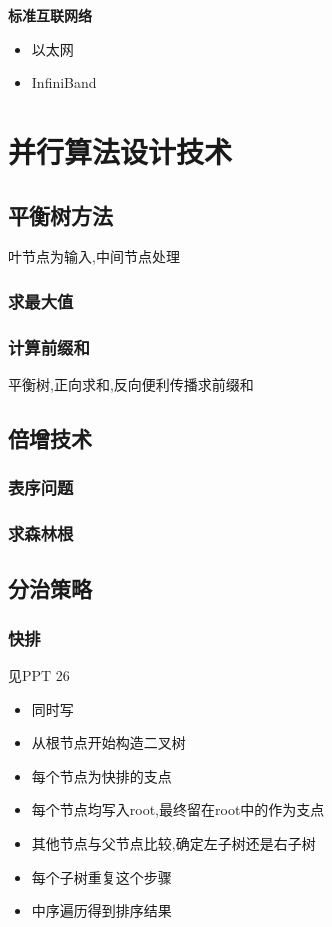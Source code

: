 \documentclass[UTF8,a4paper]{ctexart}
\newcommand{\spaceline}{\vspace{\baselineskip}}
\begin{document}
  \spaceline
  \textbf{标准互联网络}
  \begin{itemize}
    \item 以太网
    \item InfiniBand
  \end{itemize}


  \section{并行算法设计技术}
  \subsection{平衡树方法}
  叶节点为输入,中间节点处理

  \subsubsection{求最大值}
  \subsubsection{计算前缀和}
  平衡树,正向求和,反向便利传播求前缀和

  \subsection{倍增技术}

  \subsubsection{表序问题}
  \subsubsection{求森林根}

  \subsection{分治策略}

  \subsubsection{快排}
  见PPT 26


  \begin{itemize}
    \item 同时写
    \item 从根节点开始构造二叉树
    \item 每个节点为快排的支点
    \item 每个节点均写入root,最终留在root中的作为支点
    \item 其他节点与父节点比较,确定左子树还是右子树
    \item 每个子树重复这个步骤
    \item 中序遍历得到排序结果
  \end{itemize}
\end{document}

